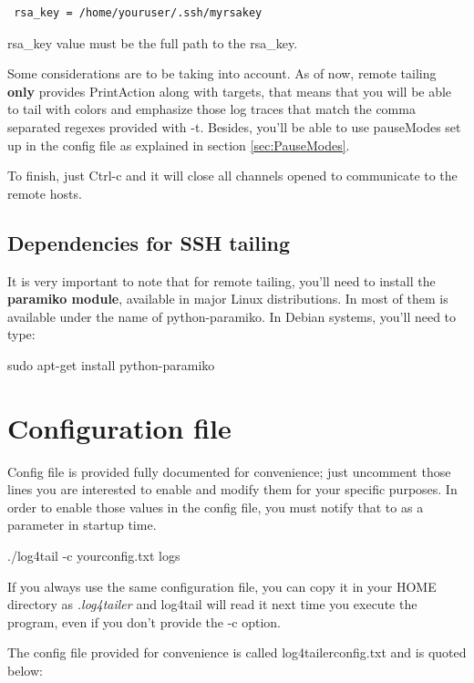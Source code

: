 \begin{config}
\begin{verbatim}
 rsa_key = /home/youruser/.ssh/myrsakey
\end{verbatim} 
\end{config}

\noindent
rsa\_key value must be the full path to the rsa\_key.

Some considerations are to be taking into account. As of now, remote tailing
\textbf{only} provides PrintAction along with targets, that means that you will
be able to tail with colors and emphasize those log traces that match the comma
separated regexes provided with -t. Besides, you'll be able to use pauseModes
set up in the config file as explained in section \ref{sec:PauseModes}.

To finish, just Ctrl-c and it will close all channels opened to communicate to
the remote hosts. 

\subsection{Dependencies for SSH tailing}
It is very important to note that for remote tailing, you'll need to install
the \textbf{paramiko module}, available in major Linux distributions. In most
of them is available under the name of python-paramiko. In Debian systems,
you'll need to type:
\begin{cmd}
 sudo apt-get install python-paramiko
\end{cmd}

\section{Configuration file}
Config file is provided fully documented for convenience; just uncomment those
lines you are interested to enable and modify them for your specific purposes.
In order to enable those values in the config file, you must notify that to
\logftailer{} as a parameter in startup time.

\begin{cmd}
 ./log4tail -c yourconfig.txt logs
\end{cmd}
If you always use the same configuration file, you can copy it in your HOME
directory as \emph{.log4tailer} and log4tail will read it next time you execute
the program, even if you don't provide the -c option.

The config file provided for convenience is called log4tailerconfig.txt and is quoted below:

